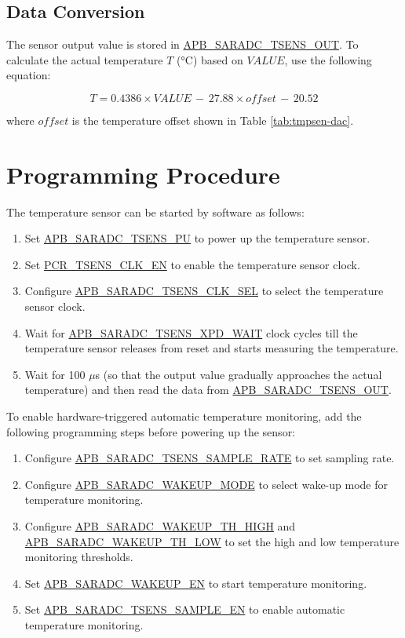 \documentclass[main\_\_EN.tex]{subfiles}
\begin{document}
\subsection{Data Conversion}

The sensor output value is stored in \hyperref[fielddesc:APBSARADCTSENSOUT]{APB\_SARADC\_TSENS\_OUT}. To calculate the actual temperature \(T\) (°C) based on \(VALUE\), use the following equation:

\[
        T = 0.4386 \times VALUE \,-\, 27.88 \times offset \,-\, 20.52
\]

where \(offset\) is the temperature offset shown in Table \ref{tab:tmpsen-dac}.

\section{Programming Procedure}

The temperature sensor can be started by software as follows:
    \begin{enumerate}
        \item Set \hyperref[fielddesc:APBSARADCTSENSPU]{APB\_SARADC\_TSENS\_PU} to power up the temperature sensor.
        \item Set \hyperref[fielddesc:PCRTSENSCLKEN]{PCR\_TSENS\_CLK\_EN} to enable the temperature sensor clock.
        \item Configure \hyperref[fielddesc:APBSARADCTSENSCLKSEL]{APB\_SARADC\_TSENS\_CLK\_SEL} to select the temperature sensor clock.
        \item Wait for \hyperref[fielddesc:APBSARADCTSENSXPDWAIT]{APB\_SARADC\_TSENS\_XPD\_WAIT} clock cycles till the temperature sensor releases from reset and starts measuring the temperature.
        \item Wait for 100 $\mu$s (so that the output value gradually approaches the actual temperature) and then read the data from \hyperref[fielddesc:APBSARADCTSENSOUT]{APB\_SARADC\_TSENS\_OUT}.
    \end{enumerate}

To enable hardware-triggered automatic temperature monitoring, add the following programming steps before powering up the sensor:
    \begin{enumerate}
        \item Configure \hyperref[fielddesc:APBSARADCTSENSSAMPLERATE]{APB\_SARADC\_TSENS\_SAMPLE\_RATE} to set sampling rate.
        \item Configure \hyperref[fielddesc:APBSARADCWAKEUPMODE]{APB\_SARADC\_WAKEUP\_MODE} to select wake-up mode for temperature monitoring.
        \item Configure \hyperref[fielddesc:APBSARADCWAKEUPTHHIGH]{APB\_SARADC\_WAKEUP\_TH\_HIGH} and \hyperref[fielddesc:APBSARADCWAKEUPTHLOW]{APB\_SARADC\_WAKEUP\_TH\_LOW} to set the high and low temperature monitoring thresholds.
        \item Set \hyperref[fielddesc:APBSARADCWAKEUPEN]{APB\_SARADC\_WAKEUP\_EN} to start temperature monitoring.
        \item Set \hyperref[fielddesc:APBSARADCTSENSSAMPLEEN]{APB\_SARADC\_TSENS\_SAMPLE\_EN} to enable automatic temperature monitoring.
    \end{enumerate}
\end{document}
